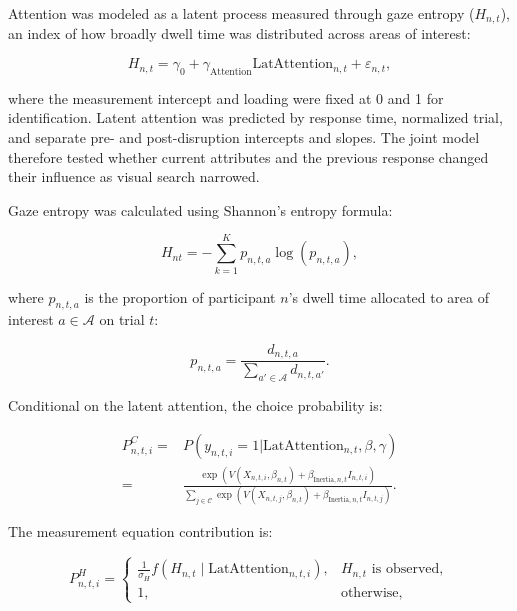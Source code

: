 \documentclass[man,natbib,floatsintext]{apa7}
\begin{document}
Attention was modeled as a latent process measured through gaze entropy ($H_{n,t}$), an index of how broadly dwell time was distributed across areas of interest:

\begin{equation}
H_{n,t} =\gamma_0+\gamma_{\text{Attention}}\text{LatAttention}_{n,t} + \varepsilon_{n,t},
\end{equation}

where the measurement intercept and loading were fixed at 0 and 1 for identification. Latent attention was predicted by response time, normalized trial, and separate pre- and post-disruption intercepts and slopes. The joint model therefore tested whether current attributes and the previous response changed their influence as visual search narrowed.

Gaze entropy was calculated using Shannon's entropy formula:

\begin{equation}
    H_{nt}=
    -\sum_{k=1}^{K} p_{n,t,a}\log\left(p_{n,t,a}\right),
\label{eq:shannon_entropy}
\end{equation}

where $p_{n,t,a}$ is the proportion of participant $n$'s dwell time allocated to area of interest $a\in \mathcal{A}$ on trial $t$:

\begin{equation}
    p_{n,t,a}=\frac{d_{n,t,a}}{\sum_{a'\in \mathcal{A}}{d_{n,t,a'}}}.
\end{equation}

Conditional on the latent attention, the choice probability is:

\begin{equation} 
\begin{split}
P^C_{n,t,i}=&P(y_{n,t,i}=1|\text{LatAttention}_{n,t},\beta,\gamma) \\
=&\frac{\exp(V(X_{n,t,i}, \beta_{n,t})
+ \beta_{\text{Inertia},n,t} I_{n,t,i})} {\displaystyle\sum_{j\in\mathcal{C}}\exp(V(X_{n,t,j}, \beta_{n,t})
+ \beta_{\text{Inertia},n,t} I_{n,t,j})}.
\end{split}
\end{equation}


The measurement equation contribution is:

\begin{equation} 
P^{H}_{n,t,i} = \begin{cases} \frac{1}{\sigma_H}f\left(H_{n,t}\mid \text{LatAttention}_{n,t,i}\right), & H_{n,t}\text{ is observed},\\ 1, & \text{otherwise},
\end{cases} 
\end{equation}
\end{document}
